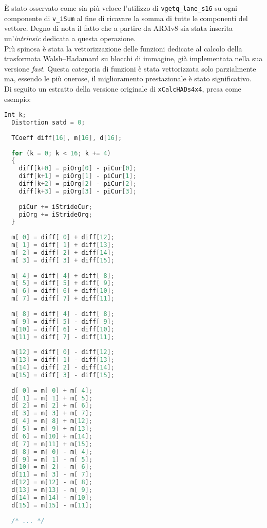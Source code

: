 \`E stato osservato come sia più veloce l'utilizzo di \verb|vgetq_lane_s16| su 
ogni componente di \verb|v_iSum| al fine di ricavare la somma di tutte le 
componenti del vettore. Degno di nota il fatto che a partire da ARMv8 sia stata 
inserita un'\emph{intrinsic} dedicata a questa operazione.\\

Più spinosa è stata la vettorizzazione delle funzioni dedicate al calcolo della 
trasformata Walsh–Hadamard su blocchi di immagine, già implementata nella sua 
versione \emph{fast}. Questa categoria di funzioni è stata vettorizzata solo 
parzialmente ma, essendo le più onerose, il miglioramento prestazionale è stato 
significativo.\\

Di seguito un estratto della versione originale di \verb|xCalcHADs4x4|, presa 
come esempio:

\begin{lstlisting}[language=C]
  Int k;
  Distortion satd = 0;
  
  TCoeff diff[16], m[16], d[16];
  
  for (k = 0; k < 16; k += 4)
  {
    diff[k+0] = piOrg[0] - piCur[0];
    diff[k+1] = piOrg[1] - piCur[1];
    diff[k+2] = piOrg[2] - piCur[2];
    diff[k+3] = piOrg[3] - piCur[3];
  
    piCur += iStrideCur;
    piOrg += iStrideOrg;
  }
  
  m[ 0] = diff[ 0] + diff[12];
  m[ 1] = diff[ 1] + diff[13];
  m[ 2] = diff[ 2] + diff[14];
  m[ 3] = diff[ 3] + diff[15];
  
  m[ 4] = diff[ 4] + diff[ 8];
  m[ 5] = diff[ 5] + diff[ 9];
  m[ 6] = diff[ 6] + diff[10];
  m[ 7] = diff[ 7] + diff[11];
  
  m[ 8] = diff[ 4] - diff[ 8];
  m[ 9] = diff[ 5] - diff[ 9];
  m[10] = diff[ 6] - diff[10];
  m[11] = diff[ 7] - diff[11];
  
  m[12] = diff[ 0] - diff[12];
  m[13] = diff[ 1] - diff[13];
  m[14] = diff[ 2] - diff[14];
  m[15] = diff[ 3] - diff[15];
  
  d[ 0] = m[ 0] + m[ 4];
  d[ 1] = m[ 1] + m[ 5];
  d[ 2] = m[ 2] + m[ 6];
  d[ 3] = m[ 3] + m[ 7];
  d[ 4] = m[ 8] + m[12];
  d[ 5] = m[ 9] + m[13];
  d[ 6] = m[10] + m[14];
  d[ 7] = m[11] + m[15];
  d[ 8] = m[ 0] - m[ 4];
  d[ 9] = m[ 1] - m[ 5];
  d[10] = m[ 2] - m[ 6];
  d[11] = m[ 3] - m[ 7];
  d[12] = m[12] - m[ 8];
  d[13] = m[13] - m[ 9];
  d[14] = m[14] - m[10];
  d[15] = m[15] - m[11];
  
  /* ... */
\end{lstlisting}

